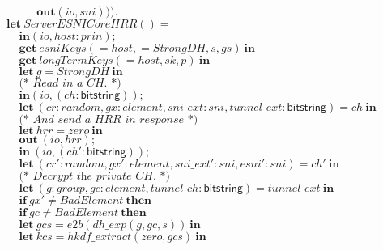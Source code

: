 \documentclass{article}
\theoremstyle{definition}
\newcommand{\kwl}[1]{\mathbf{#1}}
\newcommand{\kwt}[1]{\mathsf{#1}}
\newcommand{\var}[1]{\mathit{#1}}
\theoremstyle{definition}
\begin{document}
\begin{tabbing}
$\ \ \ \ \ \ \ \ \ \ \ \ \kwl{out}(\var{io}, \var{sni}))). $\\
$\ \ \ \ \ \ \ \  $\\
$\kwl{let}\ \var{ServerESNICoreHRR}() =  $\\
$\ \ \ \ \ \kwl{in}(\var{io}, \var{host}{:}\var{prin}); $\\
$\ \ \ \ \ \kwl{get}\ \var{esniKeys}( = \var{host},  = \var{StrongDH}, \var{s}, \var{gs})\ \kwl{in} $\\
$\ \ \ \ \ \kwl{get}\ \var{longTermKeys}( = \var{host}, \var{sk}, \var{p})\ \kwl{in} $\\
$\ \ \ \ \ \kwl{let}\ \var{g} = \var{StrongDH}\ \kwl{in} $\\
$ $\\
$\ \ \ \ \ \textit{(* Read in a CH. *)} $\\
$\ \ \ \ \ \kwl{in}(\var{io}, (\var{ch}{:}\kwt{bitstring})); $\\
$\ \ \ \ \ \kwl{let}\ (\var{cr}{:}\var{random}, \var{gx}{:}\var{element}, \var{sni{\_}ext}{:}\var{sni}, \var{tunnel{\_}ext}{:}\kwt{bitstring}) = \var{ch}\ \kwl{in} $\\
$ $\\
$\ \ \ \ \ \textit{(* And send a HRR in response *)} $\\
$\ \ \ \ \ \kwl{let}\ \var{hrr} = \var{zero}\ \kwl{in} $\\
$\ \ \ \ \ \kwl{out}\ (\var{io}, \var{hrr}); $\\
$\ \ \ \ \ \kwl{in}\ (\var{io}, (\var{ch'}{:}\kwt{bitstring})); $\\
$\ \ \ \ \ \kwl{let}\ (\var{cr'}{:}\var{random}, \var{gx'}{:}\var{element}, \var{sni{\_}ext'}{:}\var{sni}, \var{esni'}{:}\var{sni}) = \var{ch'}\ \kwl{in} $\\
$ $\\
$\ \ \ \ \ \textit{(* Decrypt the private CH. *)} $\\
$\ \ \ \ \ \kwl{let}\ (\var{g}{:}\var{group}, \var{gc}{:}\var{element}, \var{tunnel{\_}ch}{:}\kwt{bitstring}) = \var{tunnel{\_}ext}\ \kwl{in} $\\
$\ \ \ \ \ \kwl{if}\ \var{gx'}\neq\var{BadElement}\ \kwl{then} $\\
$\ \ \ \ \ \kwl{if}\ \var{gc}\neq\var{BadElement}\ \kwl{then} $\\
$\ \ \ \ \ \kwl{let}\ \var{gcs} = \var{e2b}(\var{dh{\_}exp}(\var{g}, \var{gc}, \var{s}))\ \kwl{in} $\\
$\ \ \ \ \ \kwl{let}\ \var{kcs} = \var{hkdf{\_}extract}(\var{zero}, \var{gcs})\ \kwl{in} $\\

\end{tabbing}
\end{document}
